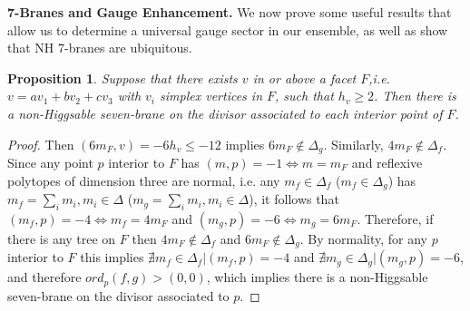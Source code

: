 \documentclass[aps,prl,twocolumn, superscriptaddress,groupedaddress,nofootinbib]{revtex4-1}
\newtheorem{prop}{Proposition}
\begin{document}

\vspace{.2cm}
\noindent \textbf{7-Branes and Gauge Enhancement.}
We now prove some useful results that allow us to determine a universal gauge sector in our ensemble, as well as show that NH 7-branes are ubiquitous.
\begin{prop}
\label{prop:NH7fromsingletree}
Suppose that there exists $v$ in or above a facet $F$,i.e. $v=av_1+bv_2+cv_3$ with $v_i$ simplex vertices in $F$, such that $h_v\geq 2$. Then there is a non-Higgsable seven-brane on the divisor associated
to each interior point of $F$.
\end{prop}

\begin{proof}
Then $(6 m_F,v)=-6h_v \leq -12$ implies $6m_F \notin \Delta_g$.
Similarly, $4m_F \notin \Delta_f$. Since any point $p$ interior to $F$ has 
$(m,p)=-1 \iff m=m_F$ and reflexive polytopes of dimension three
are normal, i.e. any $m_f\in \Delta_f$ ($m_f \in \Delta_g$) has
$m_f = \sum_i m_i, m_i\in \Delta$ ($m_g = \sum_i m_i, m_i\in \Delta$),
it follows that $(m_f,p)=-4 \iff m_f = 4m_F$ and $(m_g,p)=-6 \iff m_g = 6m_F$. Therefore, if there is any tree on $F$
then $4m_F \notin \Delta_f$ and $6m_F\notin \Delta_g$. By normality,
for any $p$ interior to $F$ this implies
$\nexists m_f \in \Delta_f | (m_f,p)=-4$ and
$\nexists m_g \in \Delta_g | (m_g,p)=-6$, and therefore $ord_p(f,g) > (0,0)$,
which implies there is a non-Higgsable seven-brane on the divisor associated to $p$.
\end{proof}
\end{document}
